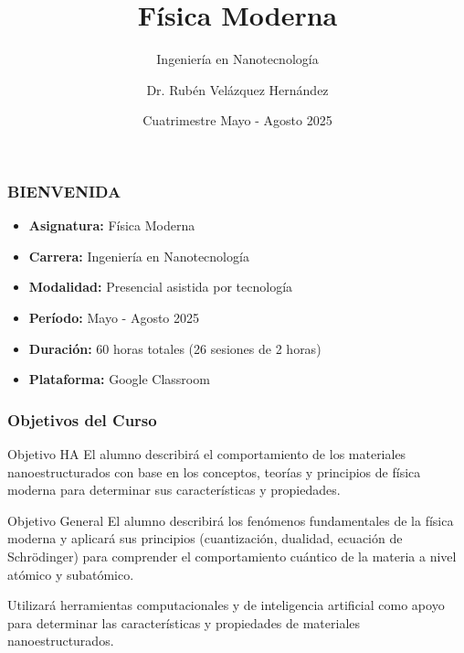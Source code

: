 \documentclass{beamer}
\title[Física Moderna]{Física Moderna}
\subtitle{Ingeniería en Nanotecnología}
\author{Dr. Rubén Velázquez Hernández}
\institute[UTEQ]{Universidad Tecnológica de Querétaro}
\date{Cuatrimestre Mayo - Agosto 2025}
\begin{document}
\frame{\titlepage}

\begin{frame}
    \frametitle{BIENVENIDA}
    \begin{itemize}
        \item \textbf{Asignatura:} Física Moderna
        \item \textbf{Carrera:} Ingeniería en Nanotecnología
        \item \textbf{Modalidad:} Presencial asistida por tecnología
        \item \textbf{Período:} Mayo - Agosto 2025
        \item \textbf{Duración:} 60 horas totales (26 sesiones de 2 horas)
        \item \textbf{Plataforma:} Google Classroom
    \end{itemize}
\end{frame}

	
\begin{frame}
    \frametitle{Objetivos del Curso}
   \begin{block}{Objetivo HA}
   		El alumno describirá el comportamiento de los materiales nanoestructurados con base en los conceptos, teorías y principios de física moderna para determinar sus características y propiedades.
   \end{block}
   \begin{block}{Objetivo General} 
   		 El alumno describirá los fenómenos fundamentales de la física moderna y aplicará sus principios (cuantización, dualidad, ecuación de Schrödinger) para comprender el comportamiento cuántico de la materia a nivel atómico y subatómico.
   		 
   		 Utilizará herramientas computacionales y de inteligencia artificial como apoyo para determinar las características y propiedades de materiales nanoestructurados.
    \end{block}
\end{frame}
\end{document}
